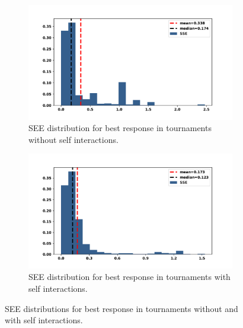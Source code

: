 \begin{figure}[!htbp]
    \begin{subfigure}{0.47\textwidth}
        \begin{center}
            \includegraphics[width=\linewidth]{src/chapters/05/paper/memory-size-in-the-prisoners-dilemma/img/best_respones_sserror.pdf}
        \end{center}
        \caption{SEE distribution for best response in tournaments without self interactions.}
    \end{subfigure}\hfill
    \begin{subfigure}{0.47\textwidth}
        \begin{center}
            \includegraphics[width=\linewidth]{src/chapters/05/paper/memory-size-in-the-prisoners-dilemma/img/evo_sserror.pdf}
        \end{center}
        \caption{SEE distribution for best response in tournaments with self interactions.}
    \end{subfigure}
    \caption{SEE distributions for best response in tournaments without and with self interactions.}\label{fig:sse_distributions}
\end{figure}

